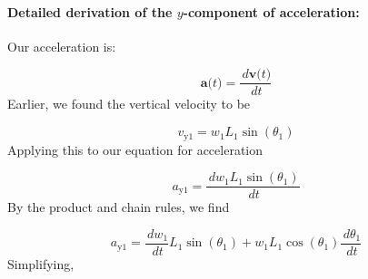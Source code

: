 \documentclass[12pt]{article}
\begin{document}
\paragraph{Detailed derivation of the $y$-component of acceleration:}
\label{GD:accelerationY1Deriv}
Our acceleration is:

\begin{displaymath}
\symbf{a}\text{(}t\text{)}=\frac{\,d\symbf{v}\text{(}t\text{)}}{\,dt}
\end{displaymath}
Earlier, we found the vertical velocity to be

\begin{displaymath}
{v_{\text{y}1}}={w_{1}} {L_{1}} \sin\left({θ_{1}}\right)
\end{displaymath}
Applying this to our equation for acceleration

\begin{displaymath}
{a_{\text{y}1}}=\frac{\,d{w_{1}} {L_{1}} \sin\left({θ_{1}}\right)}{\,dt}
\end{displaymath}
By the product and chain rules, we find

\begin{displaymath}
{a_{\text{y}1}}=\frac{\,d{w_{1}}}{\,dt} {L_{1}} \sin\left({θ_{1}}\right)+{w_{1}} {L_{1}} \cos\left({θ_{1}}\right) \frac{\,d{θ_{1}}}{\,dt}
\end{displaymath}
Simplifying,
\end{document}
